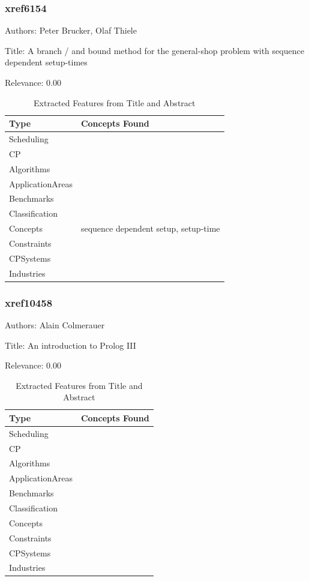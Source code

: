 \subsubsection{xref6154}
\label{mw:xref6154}

Authors: Peter Brucker, Olaf Thiele

Title: A branch / and  bound method for the general-shop problem with sequence dependent setup-times

Relevance:  0.00

{\scriptsize
\begin{longtable}{p{2cm}p{20cm}}
\caption{Extracted Features from Title and Abstract}\\ \toprule
Type & Concepts Found\\ \midrule
\endhead
\bottomrule
\endfoot
Scheduling & \\ 
CP & \\ 
Algorithms & \\ 
ApplicationAreas & \\ 
Benchmarks & \\ 
Classification & \\ 
Concepts & sequence dependent setup, setup-time\\ 
Constraints & \\ 
CPSystems & \\ 
Industries & \\ 
\end{longtable}
}



\subsubsection{xref10458}
\label{mw:xref10458}

Authors: Alain Colmerauer

Title: An introduction to Prolog III

Relevance:  0.00

{\scriptsize
\begin{longtable}{p{2cm}p{20cm}}
\caption{Extracted Features from Title and Abstract}\\ \toprule
Type & Concepts Found\\ \midrule
\endhead
\bottomrule
\endfoot
Scheduling & \\ 
CP & \\ 
Algorithms & \\ 
ApplicationAreas & \\ 
Benchmarks & \\ 
Classification & \\ 
Concepts & \\ 
Constraints & \\ 
CPSystems & \\ 
Industries & \\ 
\end{longtable}
}

